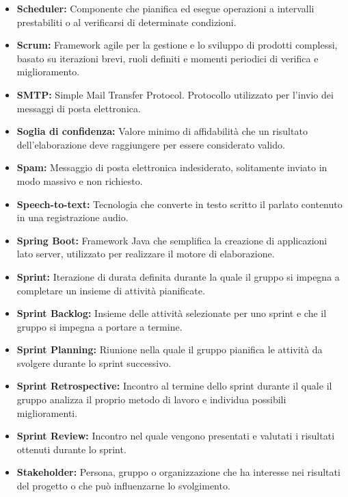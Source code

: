 \begin{itemize}
    \item \textbf{Scheduler:} Componente che pianifica ed esegue operazioni a intervalli prestabiliti o al verificarsi di determinate condizioni.
    \item \textbf{Scrum:} Framework agile per la gestione e lo sviluppo di prodotti complessi, basato su iterazioni brevi, ruoli definiti e momenti periodici di verifica e miglioramento.
    \item \textbf{SMTP:} Simple Mail Transfer Protocol. Protocollo utilizzato per l'invio dei messaggi di posta elettronica.
    \item \textbf{Soglia di confidenza:} Valore minimo di affidabilità che un risultato dell'elaborazione deve raggiungere per essere considerato valido.
    \item \textbf{Spam:} Messaggio di posta elettronica indesiderato, solitamente inviato in modo massivo e non richiesto.
    \item \textbf{Speech-to-text:} Tecnologia che converte in testo scritto il parlato contenuto in una registrazione audio.
    \item \textbf{Spring Boot:} Framework Java che semplifica la creazione di applicazioni lato server, utilizzato per realizzare il motore di elaborazione.
    \item \textbf{Sprint:} Iterazione di durata definita durante la quale il gruppo si impegna a completare un insieme di attività pianificate.
    \item \textbf{Sprint Backlog:} Insieme delle attività selezionate per uno sprint e che il gruppo si impegna a portare a termine.
    \item \textbf{Sprint Planning:} Riunione nella quale il gruppo pianifica le attività da svolgere durante lo sprint successivo.
    \item \textbf{Sprint Retrospective:} Incontro al termine dello sprint durante il quale il gruppo analizza il proprio metodo di lavoro e individua possibili miglioramenti.
    \item \textbf{Sprint Review:} Incontro nel quale vengono presentati e valutati i risultati ottenuti durante lo sprint.
    \item \textbf{Stakeholder:} Persona, gruppo o organizzazione che ha interesse nei risultati del progetto o che può influenzarne lo svolgimento.
\end{itemize}


